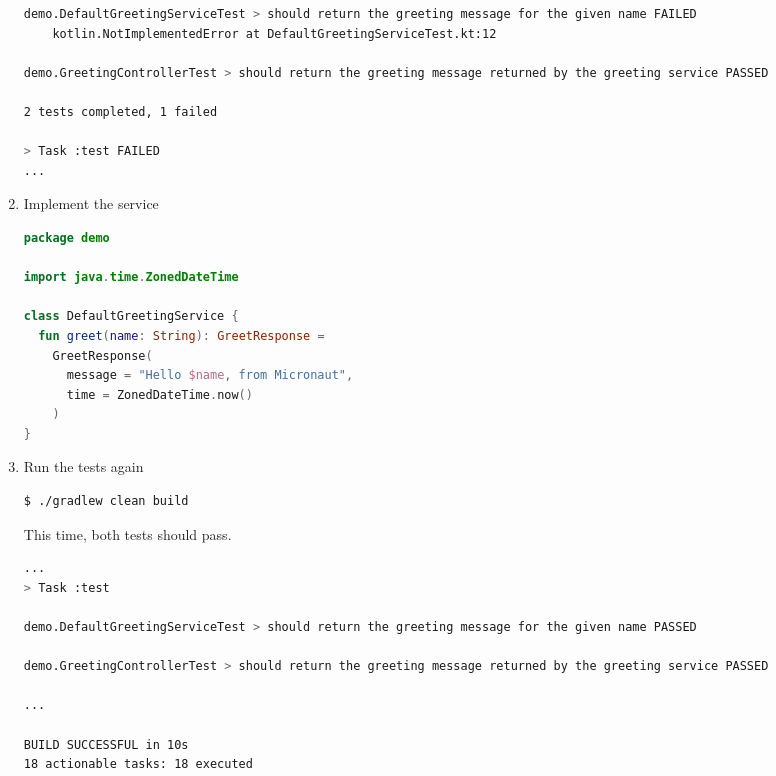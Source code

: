 \begin{enumerate}
\begin{lstlisting}[language=bash]
demo.DefaultGreetingServiceTest > should return the greeting message for the given name FAILED
    kotlin.NotImplementedError at DefaultGreetingServiceTest.kt:12

demo.GreetingControllerTest > should return the greeting message returned by the greeting service PASSED

2 tests completed, 1 failed

> Task :test FAILED
...
\end{lstlisting}

\item Implement the service

\begin{lstlisting}[language=Kotlin]
package demo

import java.time.ZonedDateTime

class DefaultGreetingService {
  fun greet(name: String): GreetResponse =
    GreetResponse(
      message = "Hello $name, from Micronaut",
      time = ZonedDateTime.now()
    )
}
\end{lstlisting}

\item Run the tests again

\begin{lstlisting}[language=bash]
$ ./gradlew clean build
\end{lstlisting}

This time, both tests should pass.

\begin{lstlisting}[language=bash]
...
> Task :test

demo.DefaultGreetingServiceTest > should return the greeting message for the given name PASSED

demo.GreetingControllerTest > should return the greeting message returned by the greeting service PASSED

...

BUILD SUCCESSFUL in 10s
18 actionable tasks: 18 executed
\end{lstlisting}

\end{enumerate}
